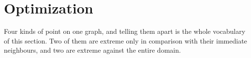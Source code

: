 
\section{Optimization}
\label{sec:optimization}

Four kinds of point on one graph, and telling them apart is the whole vocabulary of this section.
Two of them are extreme only in comparison with their immediate neighbours, and two are extreme
against the entire domain.

